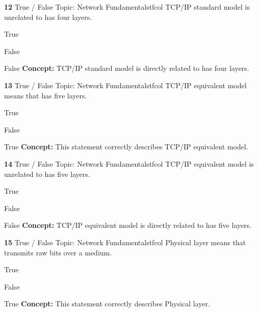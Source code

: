 \documentclass[10pt,a4paper]{article}
\begin{document}
\begin{qcard}{\color{white}\textbf{12} \hfill \small True / False \textbar{} Topic: Network Fundamentals}{tfcol}
TCP/IP standard model is unrelated to has four layers.

\begin{qoptions}
\item True
\item False
\end{qoptions}
\begin{explainbox}{False}
\textbf{Concept:} TCP/IP standard model is directly related to has four layers.
\end{explainbox}
\end{qcard}

\begin{qcard}{\color{white}\textbf{13} \hfill \small True / False \textbar{} Topic: Network Fundamentals}{tfcol}
TCP/IP equivalent model means that has five layers.

\begin{qoptions}
\item True
\item False
\end{qoptions}
\begin{explainbox}{True}
\textbf{Concept:} This statement correctly describes TCP/IP equivalent model.
\end{explainbox}
\end{qcard}

\begin{qcard}{\color{white}\textbf{14} \hfill \small True / False \textbar{} Topic: Network Fundamentals}{tfcol}
TCP/IP equivalent model is unrelated to has five layers.

\begin{qoptions}
\item True
\item False
\end{qoptions}
\begin{explainbox}{False}
\textbf{Concept:} TCP/IP equivalent model is directly related to has five layers.
\end{explainbox}
\end{qcard}

\begin{qcard}{\color{white}\textbf{15} \hfill \small True / False \textbar{} Topic: Network Fundamentals}{tfcol}
Physical layer means that transmits raw bits over a medium.

\begin{qoptions}
\item True
\item False
\end{qoptions}
\begin{explainbox}{True}
\textbf{Concept:} This statement correctly describes Physical layer.
\end{explainbox}
\end{qcard}
\end{document}
